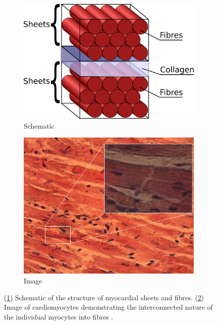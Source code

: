 \documentclass[../thesis-main.tex]{subfiles}
\begin{document}
\begin{figure}
 \centering
 \begin{subfigure}[b]{0.45\textwidth}
  \centering
  \includegraphics[width=\textwidth]{myocytes}
  \caption{Schematic}
  \label{subfig:myocyte-diagram}
 \end{subfigure}
 \begin{subfigure}[b]{0.45\textwidth}
  \centering
  \includegraphics[width=\textwidth]{myocyte-image}
  \caption{Image}
  \label{subfig:myocyte-image}
 \end{subfigure}
 \caption[Structure of myocardial sheets and fibres]{(\ref{subfig:myocyte-diagram}) Schematic of the structure of myocardial sheets and fibres. (\ref{subfig:myocyte-image}) Image of cardiomyocytes demonstrating the interconnected nature of the individual myocytes into fibres \citep{Girod2006}.}
 \label{fig:myocyte-structure}
\end{figure}
\end{document}
